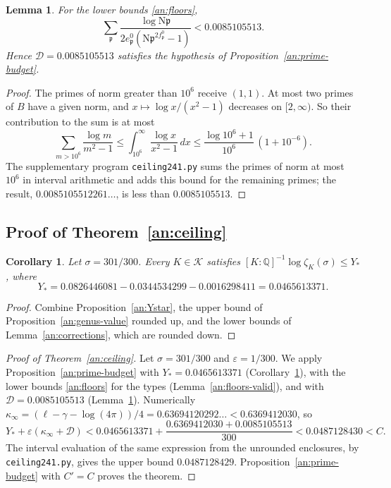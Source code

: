 \documentclass[11pt]{amsart}
\numberwithin{equation}{section}
\newtheorem{lemma}[equation]{Lemma}
\newtheorem{corollary}[equation]{Corollary}
\theoremstyle{definition}
\theoremstyle{remark}
\newcommand{\Q}{\mathbb Q}
\begin{document}
\begin{lemma}\label{an:D}
For the lower bounds \eqref{an:floors},
\begin{equation}\label{an:R}
 \sum_{\mathfrak p}\frac{\log\mathrm N\mathfrak p}
 {2e^0_{\mathfrak p}(\mathrm N\mathfrak p^{2f^0_{\mathfrak p}}-1)}
 <0.0085105513.
\end{equation}
Hence $\mathcal D=0.0085105513$ satisfies the hypothesis of
Proposition~\ref{an:prime-budget}.
\end{lemma}

\begin{proof}
The primes of norm greater than $10^6$ receive $(1,1)$. At most two primes of
$B$ have a given norm, and $x\mapsto\log x/(x^2-1)$ decreases on
$[2,\infty)$. So their contribution to the sum is at most
\[
 \sum_{m>10^6}\frac{\log m}{m^2-1}\le\int_{10^6}^\infty\frac{\log x}{x^2-1}\,dx
 \le\frac{\log10^6+1}{10^6}\,(1+10^{-6}).
\]
The supplementary program \texttt{ceiling241.py} sums the primes of norm at
most $10^6$ in interval arithmetic and adds this bound for the remaining
primes; the result, $0.0085105512261\ldots$, is less than $0.0085105513$.
\end{proof}

\subsection{\texorpdfstring{Proof of Theorem~\ref{an:ceiling}}{Proof of the Upper Bound}}

\begin{corollary}\label{an:Ystar-value}
Let $\sigma=301/300$. Every $K\in\mathcal K$ satisfies
$[K:\Q]^{-1}\log\zeta_K(\sigma)\le Y_*$, where
\[
 Y_*=0.0826446081-0.0344534299-0.0016298411=0.0465613371.
\]
\end{corollary}

\begin{proof}
Combine Proposition~\ref{an:Ystar}, the upper bound of
Proposition~\ref{an:genus-value} rounded up, and the lower bounds of
Lemma~\ref{an:corrections}, which are rounded down.
\end{proof}

\begin{proof}[Proof of Theorem~\ref{an:ceiling}]
Let $\sigma=301/300$ and $\varepsilon=1/300$. We apply
Proposition~\ref{an:prime-budget} with $Y_*=0.0465613371$
(Corollary~\ref{an:Ystar-value}), with the lower bounds \eqref{an:floors}
for the types (Lemma~\ref{an:floors-valid}), and with
$\mathcal D=0.0085105513$ (Lemma~\ref{an:D}). Numerically
$\kappa_\infty=(\ell-\gamma-\log(4\pi))/4=0.63694120292\ldots<0.6369412030$,
so
\[
 Y_*+\varepsilon(\kappa_\infty+\mathcal D)
 <0.0465613371+\frac{0.6369412030+0.0085105513}{300}
 <0.0487128430<C.
\]
The interval evaluation of the same expression from the unrounded
enclosures, by \texttt{ceiling241.py}, gives the upper bound
$0.0487128429$. Proposition~\ref{an:prime-budget} with $C'=C$ proves
the theorem.
\end{proof}
\end{document}
